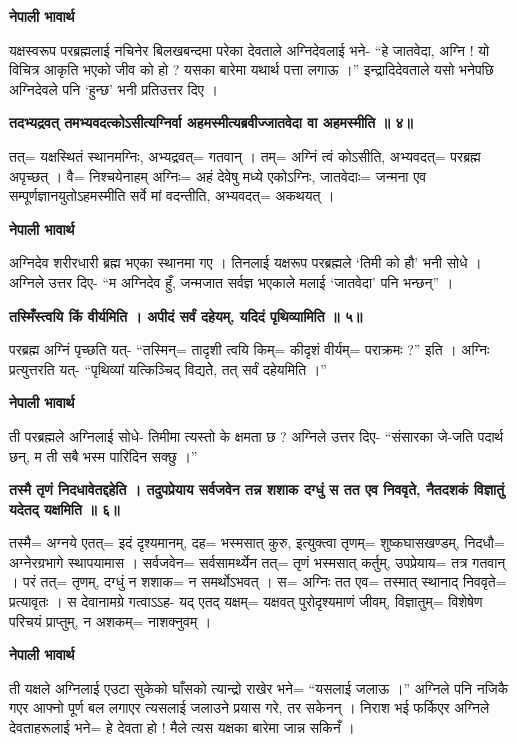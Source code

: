 \documentclass[11pt, a5paper]{article}
\begin{document}
\textbf{नेपाली भावार्थ}

यक्षस्वरूप परब्रह्मलाई नचिनेर बिलखबन्दमा परेका देवताले अग्निदेवलाई भने- “हे जातवेदा, अग्नि ! यो विचित्र आकृति भएको जीव को हो ? यसका बारेमा यथार्थ पत्ता लगाऊ ।”  इन्द्रादिदेवताले यसो भनेपछि अग्निदेवले पनि ‘हुन्छ’ भनी प्रतिउत्तर दिए ।

\textbf{तदभ्यद्रवत् तमभ्यवदत्कोऽसीत्यग्निर्वा अहमस्मीत्यब्रवीज्जातवेदा वा अहमस्मीति ॥ ४॥}

तत्= यक्षस्थितं स्थानमग्निः, अभ्यद्रवत्= गतवान् । तम्= अग्निं त्वं कोऽसीति, अभ्यवदत्= परब्रह्म अपृच्छत् । वै= निश्चयेनाहम् अग्निः‍= अहं देवेषु मध्ये एकोऽग्निः, जातवेदाः= जन्मना एव सम्पूर्णज्ञानयुतोऽहमस्मीति सर्वे मां वदन्तीति, अभ्यवदत्= अकथयत् ।

\textbf{नेपाली भावार्थ}

अग्निदेव शरीरधारी ब्रह्म भएका स्थानमा गए । तिनलाई यक्षरूप परब्रह्मले ‘तिमी को हौ’ भनी  सोधे । अग्निले उत्तर दिए- “म अग्निदेव हुँ, जन्मजात सर्वज्ञ भएकाले मलाई ‘जातवेदा’ पनि भन्छन्” ।

\textbf{तस्मिँस्त्वयि किं वीर्यमिति । अपीदं सर्वं दहेयम्, यदिदं पृथिव्यामिति ॥ ५॥}

परब्रह्म अग्निं पृच्छति यत्- “तस्मिन्= तादृशी त्वयि किम्= कीदृशं वीर्यम्= पराक्रमः ?” इति । अग्निः प्रत्युत्तरति यत्- “पृथिव्यां यत्किञ्चिद् विद्यतेे, तत् सर्वं दहेयमिति ।”

\textbf{नेपाली भावार्थ}

ती परब्रह्मले अग्निलाई सोधे- तिमीमा त्यस्तो के क्षमता छ ? अग्निले उत्तर दिए- “संसारका जे-जति पदार्थ छन्, म ती सबै भस्म पारिदिन सक्छु ।”

\textbf{तस्मै तृणं निदधावेतद्दहेति । तदुपप्रेयाय सर्वजवेन तन्न शशाक दग्धुं स तत एव निववृते, नैतदशकं विज्ञातुं यदेतद् यक्षमिति ॥ ६॥}

तस्मै= अग्नये एतत्= इदं दृश्यमानम्, दह= भस्मसात् कुरु, इत्युक्त्वा तृणम्= शुष्कघासखण्डम्, निदधौ= अग्नेरग्रभागे स्थापयामास । सर्वजवेन= सर्वसामर्थ्येन तत्= तृणं भस्मसात् कर्तुम्, उपप्रेयाय= तत्र गतवान् । परं तत्= तृणम्, दग्धुं न शशाक= न समर्थोऽभवत् । स= अग्निः तत एव= तस्मात् स्थानाद् निववृते= प्रत्यावृतः । स देवानामग्रे गत्वाऽऽह-  यद् एतद् यक्षम्= यक्षवत् पुरोदृश्यमाणं जीवम्, विज्ञातुम्= विशेषेण परिचयं प्राप्तुम्, न अशकम्= नाशक्नुवम् ।

\textbf{नेपाली भावार्थ}

ती यक्षले अग्निलाई एउटा सुकेको घाँसको त्यान्द्रो राखेर भने= “यसलाई जलाऊ ।”  अग्निले पनि नजिकै गएर आफ्नो पूर्ण बल लगाएर त्यसलाई जलाउने प्रयास गरे, तर सकेनन् । निराश भई फर्किएर अग्निले देवताहरूलाई भने= हे देवता हो ! मैले त्यस यक्षका बारेमा जान्न सकिनँ ।
\end{document}
